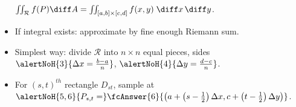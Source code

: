 \begin{frame}
\begin{columns}
\begin{itemize}
$\iint_{\mathcal{R}} f(P) \diff A = \iint_{[a,b] \times [c,d]} f(x,y) \; \diff x\, \diff y$.
\item<2-> If integral exists: approximate by fine enough Riemann sum.
\item<3-> Simplest way: divide $\mathcal R$ into $n\times n$ equal pieces, sides $\alertNoH{3}{\Delta x = \frac{b-a}{n}}$, $\alertNoH{4}{\Delta y = \frac{d-c}{n}} $.
\item<5-> For $(s,t)^{th}$ rectangle $D_{st}$, sample at  $\alertNoH{5,6}{ P_{s,t}=} \fcAnswer{6}{\left( a+ \left( s - \frac{1}{2} \right) \Delta x, c+\left( t-\frac{1}{2}\right)\Delta y\right)} $.
\end{itemize}
\end{columns}
\end{frame}
